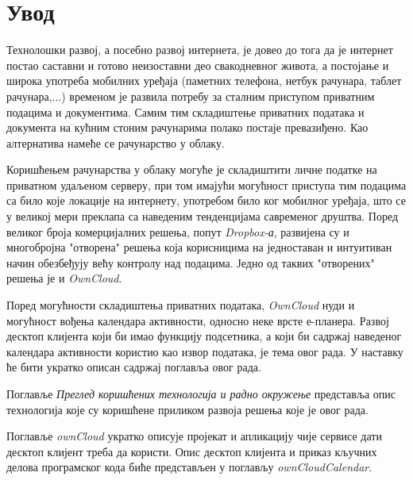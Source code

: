 \chapter{Увод}

Технолошки развој, а посебно развој интернета, је довео до тога да је интернет постао саставни и готово неизоставни део свакодневног живота, а постојање и широка употреба мобилних уређаја (паметних телефона, нетбук рачунара, таблет рачунара,...) временом је развила потребу за сталним приступом приватним подацима и документима. Самим тим складиштење приватних података и документа на кућним стоним рачунарима полако постаје превазиђено. Као алтернатива намеће се рачунарство у облаку.

Коришћењем рачунарства у облаку могуће је складиштити личне податке на приватном удаљеном серверу, при том имајући могућност приступа тим подацима са било које локације на интернету, употребом било ког мобилног уређаја, што се у великој мери преклапа са наведеним тенденцијама савременог друштва. Поред великог броја комерцијалних решења, попут \textit{Dropbox-а}, развијена су и многобројна "отворена" решења која корисницима на једноставан и интуитиван начин обезбеђују већу контролу над подацима. Једно од таквих "отворених" решења је и \textit{OwnCloud}. 

Поред могућности складиштења приватних података, \textit{OwnCloud} нуди и могућност вођења календара активности, односно неке врсте е-планера. Развој десктоп клијента који би имао функцију подсетника, а који би садржај наведеног календара активности користио као извор података, је тема овог рада. У наставку ће бити укратко описан садржај поглавља овог рада.

Поглавље \textit{Преглед коришћених технологија и радно окружење} представља  опис технологија које су коришћене приликом развоја решења које је овог рада.

Поглавље \textit{ownCloud} укратко описује пројекат и апликацију чије сервисе дати десктоп клијент треба да користи. Опис десктоп клијента и приказ кључних делова програмског кода биће представљен у поглављу \textit{ownCloudCalendar}. 